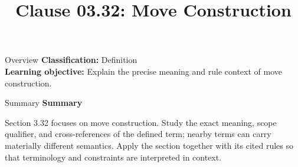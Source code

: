 \documentclass[10pt,letterpaper]{article}
\title{Clause 03.32: Move Construction}
\author{}
\date{}
\begin{document}
\maketitle
\begin{CornellOverviewBox}{Overview}
\textbf{Classification:} Definition\\[2pt]
\textbf{Learning objective:} Explain the precise meaning and rule context of move construction.
\end{CornellOverviewBox}\begin{CornellSummaryBox}{Summary}
{\sffamily\bfseries\color{Accent} Summary}\par\vspace{3pt}Section 3.32 focuses on move construction. Study the exact meaning, scope qualifier, and cross-references of the defined term; nearby terms can carry materially different semantics. Apply the section together with its cited rules so that terminology and constraints are interpreted in context.
\end{CornellSummaryBox}
\end{document}
